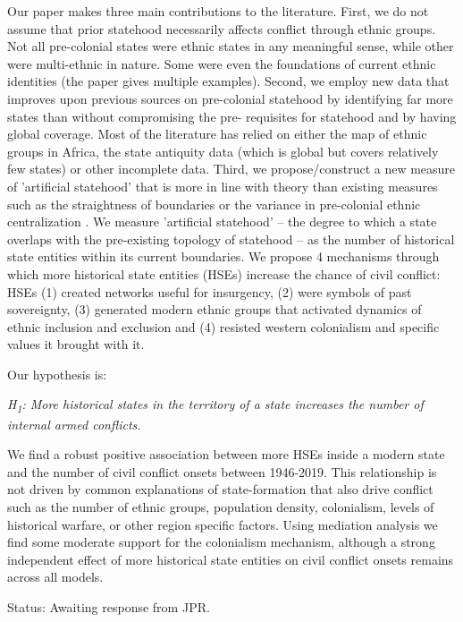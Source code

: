 \documentclass[12pt]{article}
\begin{document}
Our paper makes three main contributions to the literature.
First, we do not assume that prior statehood necessarily affects conflict through
ethnic groups. 
Not all pre-colonial states were ethnic states in any meaningful sense, while
other were multi-ethnic in nature.
Some were even the foundations of current ethnic identities (the paper gives 
multiple examples).
Second, we employ new data that improves upon previous sources on pre-colonial
statehood by identifying far more states than without compromising the pre-
requisites for statehood and by having global coverage. 
Most of the literature has relied on either the \citet{Murdock1967} map of 
ethnic groups in Africa, the state antiquity data (which is global but covers 
relatively few states) or other incomplete data.
Third, we propose/construct a new measure of 'artificial statehood' that is
more in line with theory than existing measures such as the straightness of 
boundaries \citep{Alesina2011} or the variance in pre-colonial ethnic 
centralization \citep{Englebert2002}.
We measure 'artificial statehood' -- the degree to which a state overlaps with
the pre-existing topology of statehood -- as the number of historical state 
entities within its current boundaries.
We propose 4 mechanisms through which more historical state entities (HSEs)
increase the chance of civil conflict: HSEs (1) created networks useful for 
insurgency, (2) were symbols of past sovereignty, (3) generated modern ethnic
groups that activated dynamics of ethnic inclusion and exclusion and (4)
resisted western colonialism and specific values it brought with it.

Our hypothesis is:

\bigskip
\textit{H\textsubscript{1}: More historical states in the territory of a state
increases the number of internal armed conflicts.}
\bigskip

We find a robust positive association between more HSEs inside a modern state 
and the number of civil conflict onsets between 1946-2019. 
This relationship is not driven by common explanations of state-formation that 
also drive conflict such as the number of ethnic groups, population density, 
colonialism, levels of historical warfare, or other region specific factors.
Using mediation analysis we find some moderate support for the colonialism 
mechanism, although a strong independent effect of more historical state 
entities on civil conflict onsets remains across all models. 

\bigskip
Status: Awaiting response from JPR.
\end{document}
